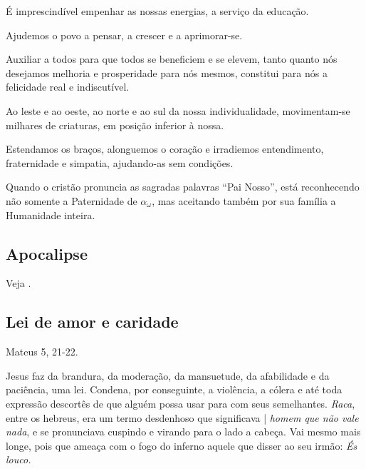 \documentclass[12pt,a4paper]{article}
\begin{document}
			\'E imprescind\'ivel empenhar as nossas energias, a servi\c{c}o da educa\c{c}\~ao.

			Ajudemos o povo a pensar, a crescer e a aprimorar-se\cite{aperfeicoamento}.

			Auxiliar a todos para que todos se beneficiem e se elevem, tanto quanto n\'os desejamos melhoria e prosperidade para n\'os mesmos, constitui para n\'os a felicidade real e indiscut\'ivel.

			Ao leste e ao oeste, ao norte e ao sul da nossa individualidade, movimentam-se milhares de criaturas, em posi\c{c}\~ao inferior \`a nossa.

			Estendamos os bra\c{c}os, alonguemos o cora\c{c}\~ao e irradiemos entendimento, fraternidade e simpatia, ajudando-as sem condi\c{c}\~oes.

			Quando o crist\~ao pronuncia as sagradas palavras \textquotedblleft Pai Nosso\textquotedblright, est\'a reconhecendo n\~ao somente a Paternidade de $ \alpha_\omega $, mas aceitando tamb\'em por sua fam\'ilia a Humanidade inteira.

		\subsection{Apocalipse}
			\begin{flushright}
			\end{flushright}

			Veja \cite{apocalipse}.

		\subsection{Lei de amor e caridade}
			\begin{flushright}
			\end{flushright}

			Mateus\cite{palavrasAtiradas} 5, 21-22.

			Jesus faz da brandura, da modera\c{c}\~ao, da mansuetude, da afabilidade e da paci\^encia, uma lei. Condena, por conseguinte, a viol\^encia, a c\'olera e at\'e toda express\~ao descort\^es de que algu\'em possa usar para com seus semelhantes. \emph{Raca}, entre os hebreus, era um termo desdenhoso que significava | \emph{homem que n\~ao vale nada}, e se pronunciava cuspindo e virando para o lado a cabe\c{c}a. Vai mesmo mais longe, pois que amea\c{c}a com o fogo do inferno\cite{demonismo} aquele que disser ao seu irm\~ao: \emph{\'Es louco\cite{mistificacao}.}
\end{document}

